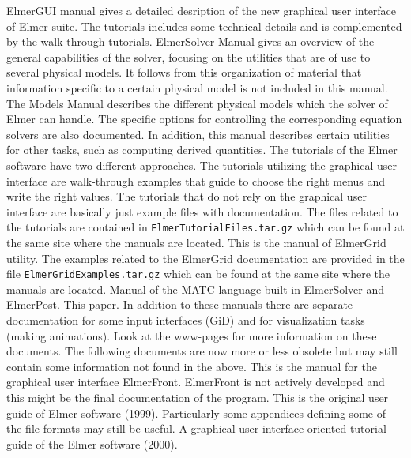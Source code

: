 \sifbegin
{}
	ElmerGUI manual gives a detailed desription of the new graphical user interface of Elmer suite.
 	The tutorials includes some technical details and is complemented by the walk-through tutorials.
	ElmerSolver Manual gives an overview of the general capabilities of the solver,
        focusing on the utilities that are of use to several physical models. It follows 
        from this organization of material that information specific to a certain physical 
        model is not included in this manual.
	The Models Manual describes the different physical models which the solver of Elmer can handle.
        The specific options for controlling the corresponding equation solvers are also documented. 
        In addition, this manual describes certain utilities for other tasks, such as computing
        derived quantities.  
	The tutorials of the Elmer software have two different approaches. The tutorials utilizing the 
	graphical user interface are walk-through examples that guide to choose the right menus and
	write the right values. The tutorials that do not rely on the graphical user interface
 	are basically just example files with documentation.
        The files related to the tutorials are contained in 
	\texttt{ElmerTutorialFiles.tar.gz} which can be found at the same site where the manuals
        are located.
	This is the manual of ElmerGrid utility. The
	examples related to the ElmerGrid documentation are provided in the file 
	\texttt{ElmerGridExamples.tar.gz} which can be found at the same site where the manuals
        are located.
	Manual of the MATC language built in ElmerSolver and ElmerPost.
	This paper.
\sifend
In addition to these manuals there are separate documentation for some input interfaces (GiD) and
for visualization tasks (making animations). Look at the www-pages for more information on these
documents. The following documents are now more or less obsolete but may still contain some 
information not found in the above.
\sifbegin
{}
	This is the manual for the graphical user interface ElmerFront. ElmerFront is not actively developed 
	and this might be the final documentation of the program.
	This is the original user guide of Elmer software (1999). Particularly some appendices 
        defining some of the file formats may still be useful.
	A graphical user interface oriented tutorial guide of the Elmer software (2000). 
\sifend





